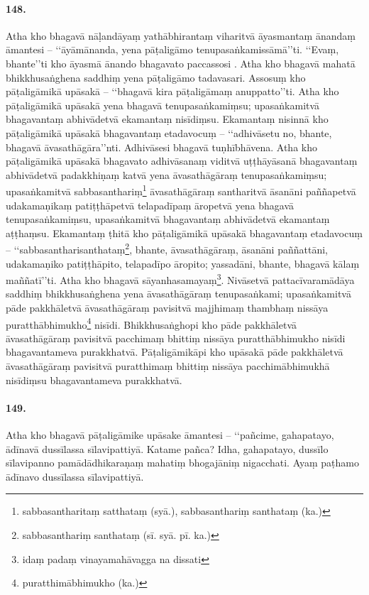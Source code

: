 \paragraph{148.} Atha kho bhagavā nāḷandāyaṃ yathābhirantaṃ viharitvā āyasmantaṃ ānandaṃ āmantesi – ‘‘āyāmānanda, yena pāṭaligāmo tenupasaṅkamissāmā’’ti. ‘‘Evaṃ, bhante’’ti kho āyasmā ānando bhagavato paccassosi . Atha kho bhagavā mahatā bhikkhusaṅghena saddhiṃ yena pāṭaligāmo tadavasari. Assosuṃ kho pāṭaligāmikā upāsakā – ‘‘bhagavā kira pāṭaligāmaṃ anuppatto’’ti. Atha kho pāṭaligāmikā upāsakā yena bhagavā tenupasaṅkamiṃsu; upasaṅkamitvā bhagavantaṃ abhivādetvā ekamantaṃ nisīdiṃsu. Ekamantaṃ nisinnā kho pāṭaligāmikā upāsakā bhagavantaṃ etadavocuṃ – ‘‘adhivāsetu no, bhante, bhagavā āvasathāgāra’’nti. Adhivāsesi bhagavā tuṇhībhāvena. Atha kho pāṭaligāmikā upāsakā bhagavato adhivāsanaṃ viditvā uṭṭhāyāsanā bhagavantaṃ abhivādetvā padakkhiṇaṃ katvā yena āvasathāgāraṃ tenupasaṅkamiṃsu; upasaṅkamitvā sabbasanthariṃ\footnote{sabbasantharitaṃ satthataṃ (syā.), sabbasanthariṃ santhataṃ (ka.)} āvasathāgāraṃ santharitvā āsanāni paññapetvā udakamaṇikaṃ patiṭṭhāpetvā telapadīpaṃ āropetvā yena bhagavā tenupasaṅkamiṃsu, upasaṅkamitvā bhagavantaṃ abhivādetvā ekamantaṃ aṭṭhaṃsu. Ekamantaṃ ṭhitā kho pāṭaligāmikā upāsakā bhagavantaṃ etadavocuṃ – ‘‘sabbasantharisanthataṃ\footnote{sabbasanthariṃ santhataṃ (sī. syā. pī. ka.)}, bhante, āvasathāgāraṃ, āsanāni paññattāni, udakamaṇiko patiṭṭhāpito, telapadīpo āropito; yassadāni, bhante, bhagavā kālaṃ maññatī’’ti. Atha kho bhagavā sāyanhasamayaṃ\footnote{idaṃ padaṃ vinayamahāvagga na dissati}. Nivāsetvā pattacīvaramādāya saddhiṃ bhikkhusaṅghena yena āvasathāgāraṃ tenupasaṅkami; upasaṅkamitvā pāde pakkhāletvā āvasathāgāraṃ pavisitvā majjhimaṃ thambhaṃ nissāya puratthābhimukho\footnote{puratthimābhimukho (ka.)} nisīdi. Bhikkhusaṅghopi kho pāde pakkhāletvā āvasathāgāraṃ pavisitvā pacchimaṃ bhittiṃ nissāya puratthābhimukho nisīdi bhagavantameva purakkhatvā. Pāṭaligāmikāpi kho upāsakā pāde pakkhāletvā āvasathāgāraṃ pavisitvā puratthimaṃ bhittiṃ nissāya pacchimābhimukhā nisīdiṃsu bhagavantameva purakkhatvā.

\paragraph{149.} Atha kho bhagavā pāṭaligāmike upāsake āmantesi – ‘‘pañcime, gahapatayo, ādīnavā dussīlassa sīlavipattiyā. Katame pañca? Idha, gahapatayo, dussīlo sīlavipanno pamādādhikaraṇaṃ mahatiṃ bhogajāniṃ nigacchati. Ayaṃ paṭhamo ādīnavo dussīlassa sīlavipattiyā.

